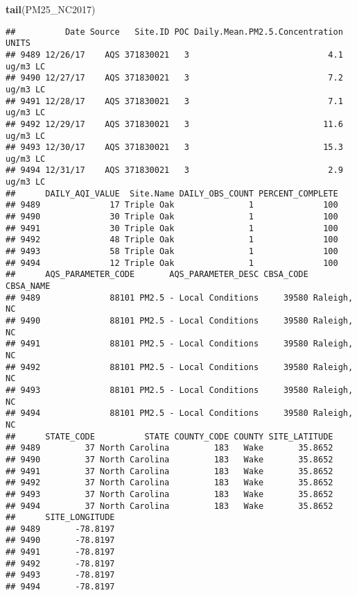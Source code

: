 \documentclass[]{article}
\newenvironment{Shaded}{\begin{snugshade}}{\end{snugshade}}
\newcommand{\KeywordTok}[1]{\textcolor[rgb]{0.13,0.29,0.53}{\textbf{#1}}}
\newcommand{\NormalTok}[1]{#1}
\begin{document}
\begin{Shaded}
\begin{Highlighting}[]
\KeywordTok{tail}\NormalTok{(PM25_NC2017)}
\end{Highlighting}
\end{Shaded}

\begin{verbatim}
##          Date Source   Site.ID POC Daily.Mean.PM2.5.Concentration    UNITS
## 9489 12/26/17    AQS 371830021   3                            4.1 ug/m3 LC
## 9490 12/27/17    AQS 371830021   3                            7.2 ug/m3 LC
## 9491 12/28/17    AQS 371830021   3                            7.1 ug/m3 LC
## 9492 12/29/17    AQS 371830021   3                           11.6 ug/m3 LC
## 9493 12/30/17    AQS 371830021   3                           15.3 ug/m3 LC
## 9494 12/31/17    AQS 371830021   3                            2.9 ug/m3 LC
##      DAILY_AQI_VALUE  Site.Name DAILY_OBS_COUNT PERCENT_COMPLETE
## 9489              17 Triple Oak               1              100
## 9490              30 Triple Oak               1              100
## 9491              30 Triple Oak               1              100
## 9492              48 Triple Oak               1              100
## 9493              58 Triple Oak               1              100
## 9494              12 Triple Oak               1              100
##      AQS_PARAMETER_CODE       AQS_PARAMETER_DESC CBSA_CODE   CBSA_NAME
## 9489              88101 PM2.5 - Local Conditions     39580 Raleigh, NC
## 9490              88101 PM2.5 - Local Conditions     39580 Raleigh, NC
## 9491              88101 PM2.5 - Local Conditions     39580 Raleigh, NC
## 9492              88101 PM2.5 - Local Conditions     39580 Raleigh, NC
## 9493              88101 PM2.5 - Local Conditions     39580 Raleigh, NC
## 9494              88101 PM2.5 - Local Conditions     39580 Raleigh, NC
##      STATE_CODE          STATE COUNTY_CODE COUNTY SITE_LATITUDE
## 9489         37 North Carolina         183   Wake       35.8652
## 9490         37 North Carolina         183   Wake       35.8652
## 9491         37 North Carolina         183   Wake       35.8652
## 9492         37 North Carolina         183   Wake       35.8652
## 9493         37 North Carolina         183   Wake       35.8652
## 9494         37 North Carolina         183   Wake       35.8652
##      SITE_LONGITUDE
## 9489       -78.8197
## 9490       -78.8197
## 9491       -78.8197
## 9492       -78.8197
## 9493       -78.8197
## 9494       -78.8197
\end{verbatim}
\end{document}
